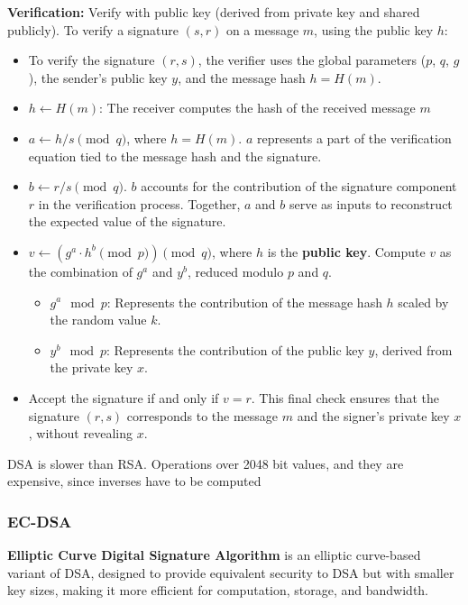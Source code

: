 \textbf{Verification:} Verify with public key (derived from private key and shared publicly).
To verify a signature $(s,r)$ on a message $m$, using the public key $h$:
\begin{itemize}
    \item To verify the signature \((r, s)\), the verifier uses the global parameters (\(p\), \(q\), \(g\)), the sender's public key \(y\), and the message hash \(h = H(m)\).
    \item $h \leftarrow H(m)$: The receiver computes the hash of the received message $m$
    \item $a \leftarrow h / s \pmod{q}$, where $h = H(m)$. 
    \(a\) represents a part of the verification equation tied to the message hash and the signature.
    \item $b \leftarrow r / s \pmod{q}$. 
    \(b\) accounts for the contribution of the signature component \(r\) in the verification process.
    Together, \(a\) and \(b\) serve as inputs to reconstruct the expected value of the signature.
    \item $v \leftarrow (g^a \cdot h^b \pmod{p}) \pmod{q}$, where $h$ is the \textbf{public key}.
    Compute \(v\) as the combination of \(g^a\) and \(y^b\), reduced modulo \(p\) and \(q\).  
    \begin{itemize}
        \item \(g^a \mod p\): Represents the contribution of the message hash \(h\) scaled by the random value \(k\).
        \item \(y^b \mod p\): Represents the contribution of the public key \(y\), derived from the private key \(x\).
    \end{itemize}

    \item Accept the signature if and only if $v = r$.
    This final check ensures that the signature \((r, s)\) corresponds to the message \(m\) and the signer’s private key \(x\), without revealing \(x\).
\end{itemize}

DSA is slower than RSA. Operations over 2048 bit values, and they are expensive, since inverses have to be computed

\subsubsection{EC-DSA}
\textbf{Elliptic Curve Digital Signature Algorithm} is an elliptic curve-based variant of DSA,
designed to provide equivalent security to DSA but with smaller key sizes, making it more efficient for computation, storage, and bandwidth. \\

